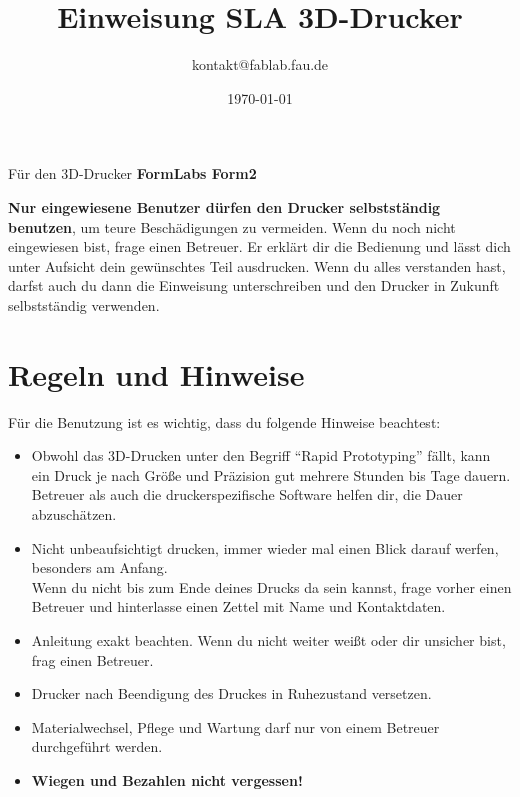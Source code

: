 \documentclass{\basedir/fablab-document}
\date{\today}
\author{kontakt@fablab.fau.de}
\title{Einweisung SLA 3D-Drucker}
\begin{document}
	
	\maketitle
	\begin{center}
		Für den 3D-Drucker \textbf{FormLabs Form2}
	\end{center}
	
	\textbf{Nur eingewiesene Benutzer dürfen den Drucker selbstständig benutzen}, um teure Beschädigungen zu vermeiden. Wenn du noch nicht eingewiesen bist, frage einen Betreuer. Er erklärt dir die Bedienung und lässt dich unter Aufsicht dein gewünschtes Teil ausdrucken. Wenn du alles verstanden hast, darfst auch du dann die Einweisung unterschreiben und den Drucker in Zukunft selbstständig verwenden.
	
	\section{Regeln und Hinweise}
	Für die Benutzung ist es wichtig, dass du folgende Hinweise beachtest:
	
	\begin{itemize}
		\item Obwohl das 3D-Drucken unter den Begriff ``Rapid Prototyping'' fällt, kann ein Druck je nach Größe und
		Präzision gut mehrere Stunden bis Tage dauern. Betreuer als auch die druckerspezifische Software helfen dir, die Dauer abzuschätzen.
		\item Nicht unbeaufsichtigt drucken, immer wieder mal einen Blick darauf werfen, besonders am Anfang.\\
		Wenn du nicht bis zum Ende deines Drucks da sein kannst, frage vorher einen Betreuer und hinterlasse einen Zettel mit Name und Kontaktdaten.
		\item Anleitung exakt beachten. Wenn du nicht weiter weißt oder dir unsicher bist, frag einen Betreuer.
		\item Drucker nach Beendigung des Druckes in Ruhezustand versetzen.
		\item Materialwechsel, Pflege und Wartung darf nur von einem Betreuer durchgeführt werden.
		\item \textbf{Wiegen und Bezahlen nicht vergessen!}
	\end{itemize}
\end{document}
